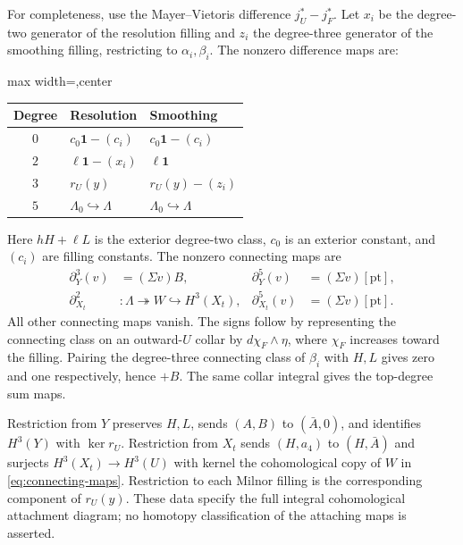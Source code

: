 For completeness, use the Mayer--Vietoris difference $j_U^*-j_F^*$.
Let $x_i$ be the degree-two generator of the resolution filling and $z_i$
the degree-three generator of the smoothing filling, restricting to
$\alpha_i,\beta_i$. The nonzero difference maps are:
\begin{center}
\begin{adjustbox}{max width=\textwidth,center}
\begin{tabular}{cll}
\toprule
Degree & Resolution & Smoothing\\
\midrule
$0$ & $c_0\mathbf1-(c_i)$ & $c_0\mathbf1-(c_i)$\\
$2$ & $\ell\mathbf1-(x_i)$ & $\ell\mathbf1$\\
$3$ & $r_U(y)$ & $r_U(y)-(z_i)$\\
$5$ & $\Lambda_0\hookrightarrow\Lambda$ & $\Lambda_0\hookrightarrow\Lambda$\\
\bottomrule
\end{tabular}
\end{adjustbox}
\end{center}
Here $hH+\ell L$ is the exterior degree-two class, $c_0$ is an exterior
constant, and $(c_i)$ are filling constants.
The nonzero connecting maps are
\begin{equation}\label{eq:connecting-maps}
 \begin{aligned}
 \partial_Y^3(v)&=(\Sigma v)B,&
 \partial_Y^5(v)&=(\Sigma v)[\mathrm{pt}],\\
 \partial_{X_t}^2&:\Lambda\twoheadrightarrow W\hookrightarrow H^3(X_t),&
 \partial_{X_t}^5(v)&=(\Sigma v)[\mathrm{pt}].
 \end{aligned}
\end{equation}
All other connecting maps vanish. The signs follow by representing the
connecting class on an outward-$U$ collar by $d\chi_F\wedge\eta$,
where $\chi_F$ increases toward the filling. Pairing the degree-three
connecting class of $\beta_i$ with $H,L$ gives zero and one respectively,
hence $+B$. The same collar integral gives the top-degree sum maps.

Restriction from $Y$ preserves $H,L$, sends $(A,B)$ to $(\bar A,0)$,
and identifies $H^3(Y)$ with $\ker r_U$. Restriction from $X_t$ sends
$(H,a_4)$ to $(H,\bar A)$ and surjects $H^3(X_t)\to H^3(U)$ with
kernel the cohomological copy of $W$ in \eqref{eq:connecting-maps}.
Restriction to each Milnor filling is the corresponding component of
$r_U(y)$. These data specify the full integral cohomological attachment
diagram; no homotopy classification of the attaching maps is asserted.

